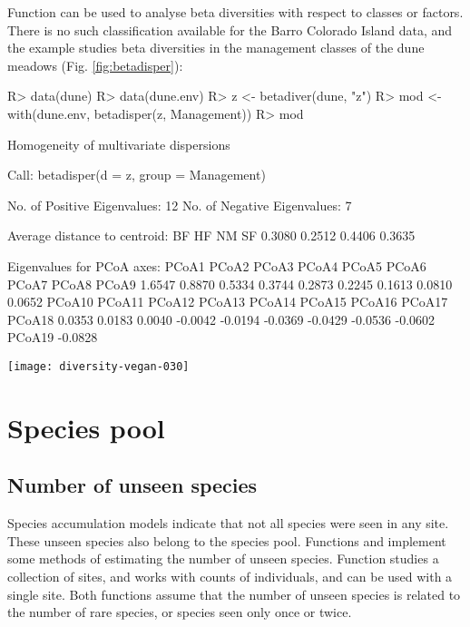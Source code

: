 \documentclass[article,nojss]{jss}
\begin{document}
Function  can be used to analyse beta diversities
with respect to classes or factors.  There is no such classification
available for the Barro Colorado Island data, and the example studies
beta diversities in the management classes of the dune meadows
(Fig. \ref{fig:betadisper}):
\begin{Schunk}
\begin{Sinput}
R> data(dune)
R> data(dune.env)
R> z <- betadiver(dune, "z")
R> mod <- with(dune.env, betadisper(z, Management))
R> mod
\end{Sinput}
\begin{Soutput}
	Homogeneity of multivariate dispersions

Call: betadisper(d = z, group = Management)

No. of Positive Eigenvalues: 12
No. of Negative Eigenvalues: 7

Average distance to centroid:
    BF     HF     NM     SF 
0.3080 0.2512 0.4406 0.3635 

Eigenvalues for PCoA axes:
  PCoA1   PCoA2   PCoA3   PCoA4   PCoA5   PCoA6   PCoA7   PCoA8   PCoA9 
 1.6547  0.8870  0.5334  0.3744  0.2873  0.2245  0.1613  0.0810  0.0652 
 PCoA10  PCoA11  PCoA12  PCoA13  PCoA14  PCoA15  PCoA16  PCoA17  PCoA18 
 0.0353  0.0183  0.0040 -0.0042 -0.0194 -0.0369 -0.0429 -0.0536 -0.0602 
 PCoA19 
-0.0828 
\end{Soutput}
\end{Schunk}
\begin{SCfigure}
\texttt{[image: diversity-vegan-030]}
\caption{Box plots of beta diversity measured as the average steepness
  ($z$) of the species area curve in the Arrhenius model $S = cX^z$ in
  Management classes of dune meadows.}
\label{fig:betadisper}
\end{SCfigure}

\section{Species pool}
\subsection{Number of unseen species}

Species accumulation models indicate that not all species were seen in
any site.  These unseen species also belong to the species pool.
Functions  and  implement some
methods of estimating the number of unseen species.  Function
 studies a collection of sites, and
 works with counts of individuals, and can be used
with a single site.  Both functions assume that the number of unseen
species is related to the number of rare species, or species seen only
once or twice.
\end{document}
